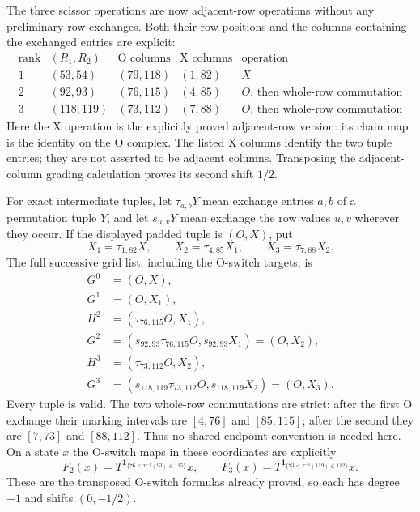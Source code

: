 \documentclass[11pt,a4paper]{article}
\theoremstyle{remark}
\begin{document}
The three scissor operations are now adjacent-row operations without
any preliminary row exchanges.  Both their row positions and the
columns containing the exchanged entries are explicit:
\[
\begin{array}{c|c|c|c|c}
\text{rank}&(R_1,R_2)&\text{O columns}&\text{X columns}&\text{operation}\\\hline
1&(53,54)&(79,118)&(1,82)&X\\
2&(92,93)&(76,115)&(4,85)&O\text{, then whole-row commutation}\\
3&(118,119)&(73,112)&(7,88)&O\text{, then whole-row commutation}
\end{array}
\]
Here the X operation is the explicitly proved adjacent-row version:
its chain map is the identity on the O complex.  The listed X columns
identify the two tuple entries; they are not asserted to be adjacent
columns.  Transposing the adjacent-column grading calculation proves
its second shift $1/2$.

For exact intermediate tuples, let $\tau_{a,b}Y$ mean exchange entries
$a,b$ of a permutation tuple $Y$, and let $s_{u,v}Y$ mean exchange
the row values $u,v$ wherever they occur.  If the displayed padded tuple
is $(O,X)$, put
\[
 X_1=\tau_{1,82}X,\qquad
 X_2=\tau_{4,85}X_1,\qquad
 X_3=\tau_{7,88}X_2.
\]
The full successive grid list, including the O-switch targets, is
\[
\begin{split}
G^0&=(O,X),\\
G^1&=(O,X_1),\\
H^2&=(\tau_{76,115}O,X_1),\\
G^2&=(s_{92,93}\tau_{76,115}O,s_{92,93}X_1)=(O,X_2),\\
H^3&=(\tau_{73,112}O,X_2),\\
G^3&=(s_{118,119}\tau_{73,112}O,s_{118,119}X_2)=(O,X_3).
\end{split}
\]
Every tuple is valid.  The two whole-row commutations are strict:
after the first O exchange their marking intervals are $[4,76]$ and
$[85,115]$; after the second they are $[7,73]$ and $[88,112]$.
Thus no shared-endpoint convention is needed here.  On a state $x$
the O-switch maps in these coordinates are explicitly
\[
 F_2(x)=T^{\mathbf1_{\{76<x^{-1}(93)\le115\}}}x,
 \qquad
 F_3(x)=T^{\mathbf1_{\{73<x^{-1}(119)\le112\}}}x.
\]
These are the transposed O-switch formulas already proved, so each
has degree $-1$ and shifts $(0,-1/2)$.
\end{document}
